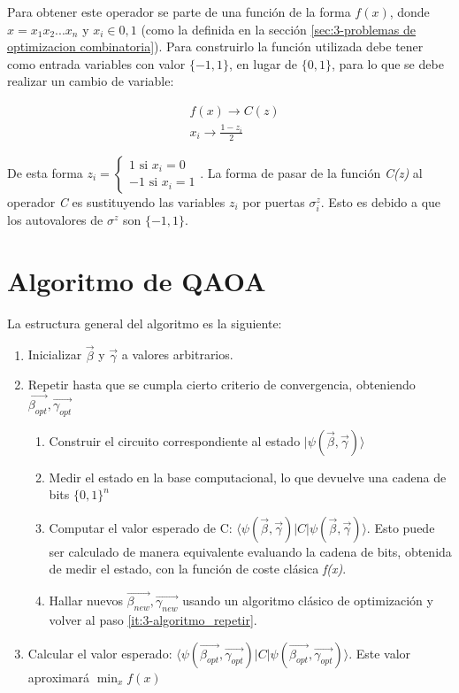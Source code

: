 Para obtener este operador se parte de una función de la forma \(f(x)\), donde \(x=x_1x_2...x_n\) y \(x_i\in{0, 1}\) (como la definida en la sección \ref{sec:3-problemas de optimizacion combinatoria}). Para construirlo la función utilizada debe tener como entrada variables con valor \(\{-1, 1\}\), en lugar de \(\{0, 1\}\), para lo que se debe realizar un cambio de variable:

\begin{align*}
  &f(x) \rightarrow C(z) \\
  &x_i \rightarrow \frac{1 - z_i}{2}
\end{align*}

De esta forma \(z_i = \begin{cases}
  1 \text{ si } x_i = 0 \\
  -1 \text{ si } x_i = 1
\end{cases}\).
La forma de pasar de la función \textit{C(z)} al operador \textit{C} es sustituyendo las variables \(z_i\) por puertas \(\sigma^z_i\). Esto es debido a que los autovalores de \(\sigma^z\) son $\{-1, 1\}$.  %

\section{Algoritmo de QAOA}
La estructura general del algoritmo es la siguiente:
\begin{enumerate}
\item Inicializar \(\vec{\beta}\) y \(\vec{\gamma}\) a valores arbitrarios.
\item Repetir hasta que se cumpla cierto criterio de convergencia, obteniendo \(\vec{\beta_{opt}}, \vec{\gamma_{opt}}\)
  \label{it:3-algoritmo_repetir}
  \begin{enumerate}
  \item Construir el circuito correspondiente al estado \(\lvert\psi(\vec{\beta}, \vec{\gamma})\rangle\)
  \item Medir el estado en la base computacional, lo que devuelve una cadena de bits \(\{0, 1\}^n\)
  \item Computar el valor esperado de C: \( \langle \psi(\vec{\beta}, \vec{\gamma}) \rvert C \lvert \psi(\vec{\beta}, \vec{\gamma}) \rangle \).
    Esto puede ser calculado de manera equivalente evaluando la cadena de bits, obtenida de medir el estado, con la función de coste clásica \textit{f(x)}.
  \item Hallar nuevos \(\vec{\beta_{new}}, \vec{\gamma_{new}}\) usando un algoritmo clásico de optimización y volver al paso \ref{it:3-algoritmo_repetir}.
  \end{enumerate}
\item Calcular el valor esperado: \( \langle \psi(\vec{\beta_{opt}}, \vec{\gamma_{opt}}) \rvert C \lvert \psi(\vec{\beta_{opt}}, \vec{\gamma_{opt}}) \rangle \). Este valor aproximará \(\min_{x}f(x)\)
\end{enumerate}

